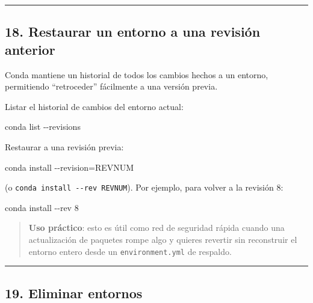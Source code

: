 \documentclass[
  doc,
  floatsintext,
  longtable,
  a4paper,
  nolmodern,
  notxfonts,
  notimes,
  12pt,
  colorlinks=true,linkcolor=blue,citecolor=blue,urlcolor=blue]{apa7}
\newenvironment{Shaded}{\begin{snugshade}}{\end{snugshade}}
\newcommand{\AttributeTok}[1]{\textcolor[rgb]{0.40,0.45,0.13}{#1}}
\newcommand{\ExtensionTok}[1]{\textcolor[rgb]{0.00,0.23,0.31}{#1}}
\newcommand{\NormalTok}[1]{\textcolor[rgb]{0.00,0.23,0.31}{#1}}
\newcommand{\OperatorTok}[1]{\textcolor[rgb]{0.37,0.37,0.37}{#1}}
\begin{document}
\begin{center}\rule{0.5\linewidth}{0.5pt}\end{center}

\subsection{18. Restaurar un entorno a una revisión
anterior}\label{restaurar-un-entorno-a-una-revisiuxf3n-anterior}

Conda mantiene un historial de todos los cambios hechos a un entorno,
permitiendo ``retroceder'' fácilmente a una versión previa.

Listar el historial de cambios del entorno actual:

\begin{Shaded}
\begin{Highlighting}[]
\ExtensionTok{conda}\NormalTok{ list }\AttributeTok{{-}{-}revisions}
\end{Highlighting}
\end{Shaded}

Restaurar a una revisión previa:

\begin{Shaded}
\begin{Highlighting}[]
\ExtensionTok{conda}\NormalTok{ install }\AttributeTok{{-}{-}revision}\OperatorTok{=}\NormalTok{REVNUM}
\end{Highlighting}
\end{Shaded}

(o \texttt{conda\ install\ -\/-rev\ REVNUM}). Por ejemplo, para volver a
la revisión 8:

\begin{Shaded}
\begin{Highlighting}[]
\ExtensionTok{conda}\NormalTok{ install }\AttributeTok{{-}{-}rev}\NormalTok{ 8}
\end{Highlighting}
\end{Shaded}

\begin{quote}
\textbf{Uso práctico}: esto es útil como red de seguridad rápida cuando
una actualización de paquetes rompe algo y quieres revertir sin
reconstruir el entorno entero desde un \texttt{environment.yml} de
respaldo.
\end{quote}

\begin{center}\rule{0.5\linewidth}{0.5pt}\end{center}

\subsection{19. Eliminar entornos}\label{eliminar-entornos}
\end{document}
